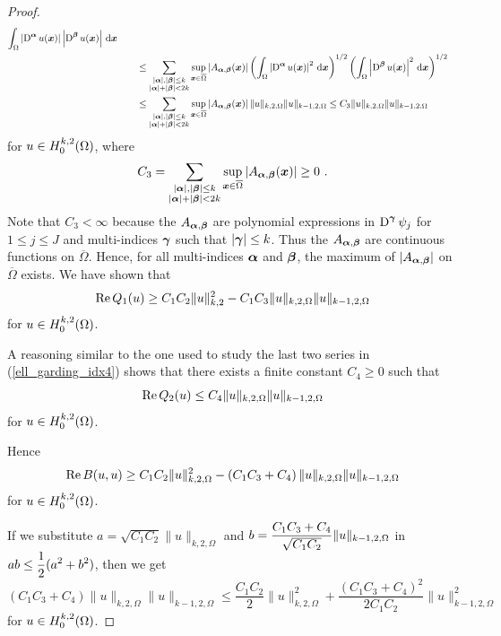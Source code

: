 \begin{proof}
\begin{align*}
\int_\Omega \left| \operatorname{D}^{{\bm{\alpha}}} u({\bm{x}}) \right|
\left| \operatorname{D}^{{\bm{\beta}}} u({\bm{x}}) \right| \,\mathrm{d}{{\bm{x}}} \\
&\qquad \leq \sum_{\substack{|{\bm{\alpha}}|,|{\bm{\beta}}|\leq k\\
|{\bm{\alpha}}|+|{\bm{\beta}}|<2k}} \sup_{{\bm{x}} \in \overline{\Omega}}
\left| A_{{\bm{\alpha}},{\bm{\beta}}}({\bm{x}})\right|
\left( \int_\Omega \left| \operatorname{D}^{{\bm{\alpha}}} u({\bm{x}}) \right|^2
\,\mathrm{d}{{\bm{x}}}\right)^{1/2}
\left( \int_\Omega \left| \operatorname{D}^{{\bm{\beta}}} u({\bm{x}}) \right|^2 \,\mathrm{d}{{\bm{x}}}
\right)^{1/2} \\
&\qquad \leq \sum_{\substack{|{\bm{\alpha}}|,|{\bm{\beta}}|\leq k\\
|{\bm{\alpha}}|+|{\bm{\beta}}|<2k}} \sup_{{\bm{x}} \in \overline{\Omega}}
\left| A_{{\bm{\alpha}},{\bm{\beta}}}({\bm{x}})\right|
\|u\|_{k,2,\Omega} \|u\|_{k-1,2,\Omega}
\leq C_3 \|u\|_{k,2,\Omega} \|u\|_{k-1,2,\Omega} 
\end{align*}
for $\displaystyle u \in H^{k,2}_0(\Omega)$, where
\[
C_3 = \sum_{\substack{|{\bm{\alpha}}|,|{\bm{\beta}}|\leq
k\\|{\bm{\alpha}}|+|{\bm{\beta}}|<2k}} \sup_{{\bm{x}} \in \overline{\Omega}}
\left| A_{{\bm{\alpha}},{\bm{\beta}}}({\bm{x}})\right| \geq 0 \  .
\]
Note that $C_3 < \infty$ because the $A_{{\bm{\alpha}},{\bm{\beta}}}$ are
polynomial expressions in $\displaystyle \operatorname{D}^{{\bm{\gamma}}} \psi_j$ for
$1\leq j \leq J$ and multi-indices ${\bm{\gamma}}$ such that
$|{\bm{\gamma}}|\leq k$.  Thus the $A_{{\bm{\alpha}},{\bm{\beta}}}$ are
continuous functions on $\overline{\Omega}$.  Hence, for
all multi-indices ${\bm{\alpha}}$ and ${\bm{\beta}}$, the
maximum of $|A_{{\bm{\alpha}},{\bm{\beta}}}|$
on $\overline{\Omega}$ exists.  We have shown that
\[
\operatorname{Re} Q_1(u) \geq C_1C_2 \|u\|_{k,2}^2
- C_1C_3 \|u\|_{k,2,\Omega} \|u\|_{k-1,2,\Omega} 
\]
for $\displaystyle u \in H^{k,2}_0(\Omega)$.

A reasoning similar to the one used to study the last two series in
(\ref{ell_garding_idx4}) shows that there exists a finite constant
$C_4 \geq 0$ such that
\[
\operatorname{Re} Q_2(u) \leq C_4 \|u\|_{k,2,\Omega} \|u\|_{k-1,2,\Omega} 
\]
for $\displaystyle u \in H^{k,2}_0(\Omega)$.

Hence
\begin{equation} \label{ell_garding_idx2}
\operatorname{Re} B(u,u) \geq C_1C_2 \|u\|_{k,2,\Omega}^2 - \left( C_1C_3 + C_4\right)
\|u\|_{k,2,\Omega} \|u\|_{k-1,2,\Omega}
\end{equation}
for $\displaystyle u \in H^{k,2}_0(\Omega)$.

If we substitute $a= \sqrt{C_1C_2} \|u\|_{k,2,\Omega}$ and
$\displaystyle b = \frac{C_1C_3 + C_4}{\sqrt{C_1C_2}}\|u\|_{k-1,2,\Omega}$ in
$\displaystyle ab \leq \frac{1}{2}(a^2+b^2)$, then we get
\[
\left( C_1C_3 + C_4\right) \|u\|_{k,2,\Omega} \|u\|_{k-1,2,\Omega}
\leq \frac{C_1C_2}{2} \|u\|_{k,2,\Omega}^2 +
\frac{(C_1C_3 + C_4)^2}{2C_1C_2}\|u\|_{k-1,2,\Omega}^2
\]
for $\displaystyle u \in H^{k,2}_0(\Omega)$.


\end{proof}
